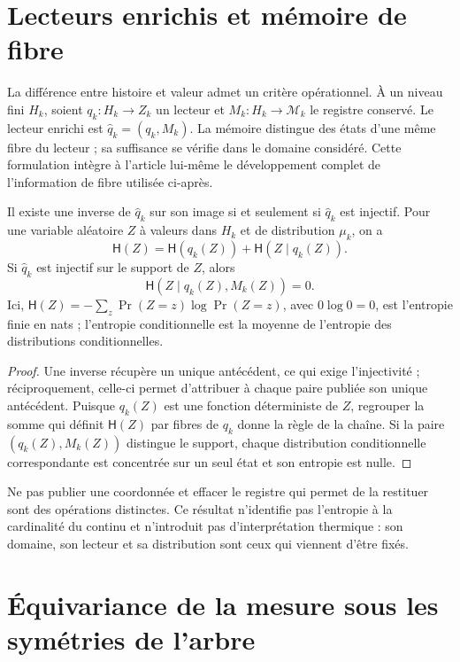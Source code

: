 \section{Lecteurs enrichis et mémoire de fibre}
\label{x_reciprocidad:sec:ch-memoria-fibra}

La différence entre histoire et valeur admet un critère opérationnel. À un
niveau fini \(H_k\), soient \(q_k:H_k\to Z_k\) un lecteur et
\(M_k:H_k\to\mathcal M_k\) le registre conservé. Le lecteur enrichi
est \(\widehat q_k=(q_k,M_k)\). La mémoire distingue des états d'une même
fibre du lecteur ; sa suffisance se vérifie dans le domaine considéré.
Cette formulation intègre à l'article lui-même le développement complet de
l'information de fibre utilisée ci-après.

\begin{proposition}
\label{x_reciprocidad:prop:ch-recuperabilidad-fibra}
Il existe une inverse de \(\widehat q_k\) sur son image si et seulement si \(\widehat q_k\) est injectif. Pour une variable aléatoire \(Z\) à valeurs dans \(H_k\) et de distribution \(\mu_k\), on a
\[
 \mathsf H(Z)=\mathsf H(q_k(Z))+\mathsf H(Z\mid q_k(Z)).
\]
Si \(\widehat q_k\) est injectif sur le support de \(Z\), alors
\[
 \mathsf H(Z\mid q_k(Z),M_k(Z))=0.
\]
Ici, \(\mathsf H(Z)=-\sum_z\Pr(Z=z)\log\Pr(Z=z)\), avec
\(0\log0=0\), est l'entropie finie en nats ; l'entropie conditionnelle est
la moyenne de l'entropie des distributions conditionnelles.
\end{proposition}

\begin{proof}
Une inverse récupère un unique antécédent, ce qui exige l'injectivité ; réciproquement, celle-ci permet d'attribuer à chaque paire publiée son unique antécédent. Puisque \(q_k(Z)\) est une fonction déterministe de \(Z\), regrouper la somme qui définit \(\mathsf H(Z)\) par fibres de \(q_k\) donne la règle de la chaîne. Si la paire \((q_k(Z),M_k(Z))\) distingue le support, chaque distribution conditionnelle correspondante est concentrée sur un seul état et son entropie est nulle.
\end{proof}

Ne pas publier une coordonnée et effacer le registre qui permet de la restituer sont
des opérations distinctes. Ce résultat n'identifie pas l'entropie à la cardinalité
du continu et n'introduit pas d'interprétation thermique : son domaine, son lecteur et sa
distribution sont ceux qui viennent d'être fixés.

\section{Équivariance de la mesure sous les symétries de l'arbre}
\label{x_reciprocidad:sec:ch-naturalidad-medida}

